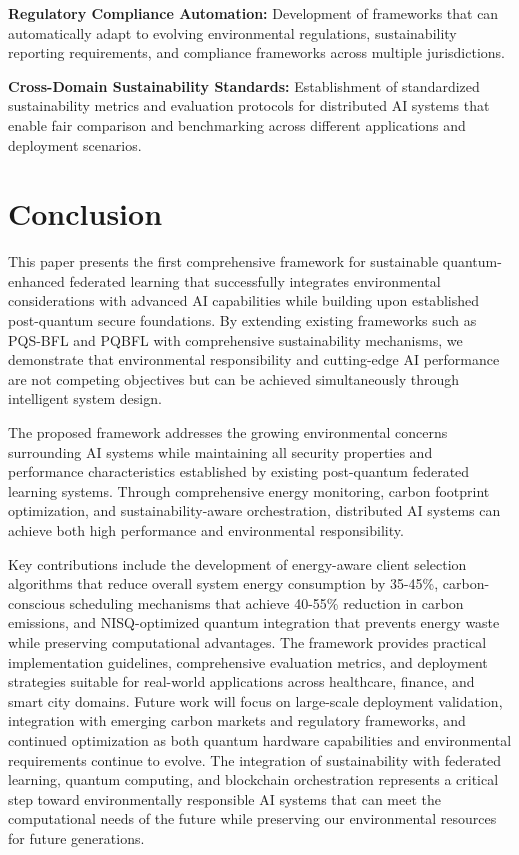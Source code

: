 \documentclass[10pt,journal,compsoc]{IEEEtran}
\begin{document}
\textbf{Regulatory Compliance Automation:} Development of frameworks that can automatically adapt to evolving environmental regulations, sustainability reporting requirements, and compliance frameworks across multiple jurisdictions.

\textbf{Cross-Domain Sustainability Standards:} Establishment of standardized sustainability metrics and evaluation protocols for distributed AI systems that enable fair comparison and benchmarking across different applications and deployment scenarios.

\section{Conclusion}

This paper presents the first comprehensive framework for sustainable quantum-enhanced federated learning that successfully integrates environmental considerations with advanced AI capabilities while building upon established post-quantum secure foundations. By extending existing frameworks such as PQS-BFL and PQBFL with comprehensive sustainability mechanisms, we demonstrate that environmental responsibility and cutting-edge AI performance are not competing objectives but can be achieved simultaneously through intelligent system design.

The proposed framework addresses the growing environmental concerns surrounding AI systems while maintaining all security properties and performance characteristics established by existing post-quantum federated learning systems. Through comprehensive energy monitoring, carbon footprint optimization, and sustainability-aware orchestration, distributed AI systems can achieve both high performance and environmental responsibility.

Key contributions include the development of energy-aware client selection algorithms that reduce overall system energy consumption by 35-45\%, carbon-conscious scheduling mechanisms that achieve 40-55\% reduction in carbon emissions, and NISQ-optimized quantum integration that prevents energy waste while preserving computational advantages. The framework provides practical implementation guidelines, comprehensive evaluation metrics, and deployment strategies suitable for real-world applications across healthcare, finance, and smart city domains.
Future work will focus on large-scale deployment validation, integration with emerging carbon markets and regulatory frameworks, and continued optimization as both quantum hardware capabilities and environmental requirements continue to evolve. The integration of sustainability with federated learning, quantum computing, and blockchain orchestration represents a critical step toward environmentally responsible AI systems that can meet the computational needs of the future while preserving our environmental resources for future generations.
\end{document}
